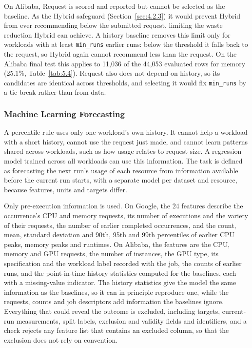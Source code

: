 On Alibaba, Request is scored and reported but cannot be selected as the baseline. As the Hybrid safeguard (Section~\ref{sec:4.2.3}) it would prevent Hybrid from ever recommending below the submitted request, limiting the waste reduction Hybrid can achieve. A history baseline removes this limit only for workloads with at least \texttt{min\_runs} earlier runs: below the threshold it falls back to the request, so Hybrid again cannot recommend less than the request. On the Alibaba final test this applies to 11,036 of the 44,053 evaluated rows for memory (25.1\%, Table~\ref{tab:5.4}). Request also does not depend on history, so its candidates are identical across thresholds, and selecting it would fix \texttt{min\_runs} by a tie-break rather than from data.

\subsubsection{Machine Learning Forecasting}\label{sec:4.2.2}

A percentile rule uses only one workload's own history. It cannot help a workload with a short history, cannot use the request just made, and cannot learn patterns shared across workloads, such as how usage relates to request size. A regression model trained across all workloads can use this information. The task is defined as forecasting the next run's usage of each resource from information available before the current run starts, with a separate model per dataset and resource, because features, units and targets differ.

Only pre-execution information is used. On Google, the 24 features describe the occurrence's CPU and memory requests, its number of executions and the variety of their requests, the number of earlier completed occurrences, and the count, mean, standard deviation and 90th, 95th and 99th percentiles of earlier CPU peaks, memory peaks and runtimes. On Alibaba, the features are the CPU, memory and GPU requests, the number of instances, the GPU type, its specification and the workload label recorded with the job, the counts of earlier runs, and the point-in-time history statistics computed for the baselines, each with a missing-value indicator. The history statistics give the model the same information as the baselines, so it can in principle reproduce one, while the requests, counts and job descriptors add information the baselines ignore. Everything that could reveal the outcome is excluded, including targets, current-run measurements, split labels, exclusion and validity fields and identifiers, and a check rejects any feature list that contains an excluded column, so that the exclusion does not rely on convention.

